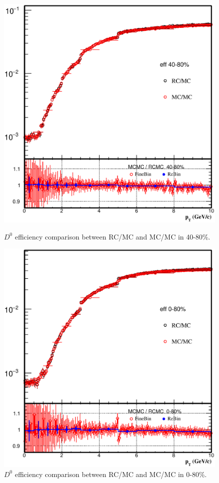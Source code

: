 \begin{figure}[htbp]
\begin{minipage}[htbp]{0.52\linewidth}
\centering
\includegraphics[width=1.0\textwidth]{figure/Run14_D0HFT/D0_eff_forMCRC_40_80.eps}
\caption{$D^{0}$ efficiency comparison between RC/MC and MC/MC in 40-80\%. \label{D0_eff_forMCRC_40_80}}
\end{minipage}
\hfill
\begin{minipage}[htbp]{0.52\linewidth}
\centering
\includegraphics[width=1.0\textwidth]{figure/Run14_D0HFT/D0_eff_forMCRC_0_80.eps} 
\caption{$D^{0}$ efficiency comparison between RC/MC and MC/MC in 0-80\%. \label{D0_eff_forMCRC_0_80}}
\end{minipage}
\end{figure}

